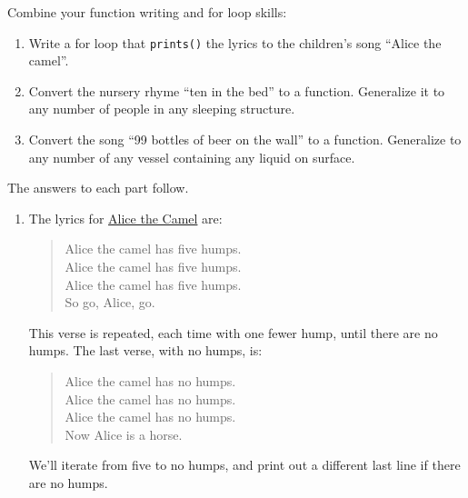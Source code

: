 \documentclass[]{book}
\theoremstyle{plain}
\theoremstyle{remark}
\begin{document}
Combine your function writing and for loop skills:

\begin{enumerate}
\def\labelenumi{\arabic{enumi}.}
\item
  Write a for loop that \texttt{prints()} the lyrics to the children's song ``Alice the camel''.
\item
  Convert the nursery rhyme ``ten in the bed'' to a function. Generalize it to any number of people in any sleeping structure.
\item
  Convert the song ``99 bottles of beer on the wall'' to a function.
  Generalize to any number of any vessel containing any liquid on surface.
\end{enumerate}

The answers to each part follow.

\begin{enumerate}
\def\labelenumi{\arabic{enumi}.}
\item
  The lyrics for \href{http://www.kididdles.com/lyrics/a012.html}{Alice the Camel} are:

  \begin{quote}
  Alice the camel has five humps.\\
  Alice the camel has five humps.\\
  Alice the camel has five humps.\\
  So go, Alice, go.
  \end{quote}

  This verse is repeated, each time with one fewer hump,
  until there are no humps.
  The last verse, with no humps, is:

  \begin{quote}
  Alice the camel has no humps.\\
  Alice the camel has no humps.\\
  Alice the camel has no humps.\\
  Now Alice is a horse.
  \end{quote}

  We'll iterate from five to no humps, and print out a different last line if there are no humps.


\end{enumerate}
\end{document}
